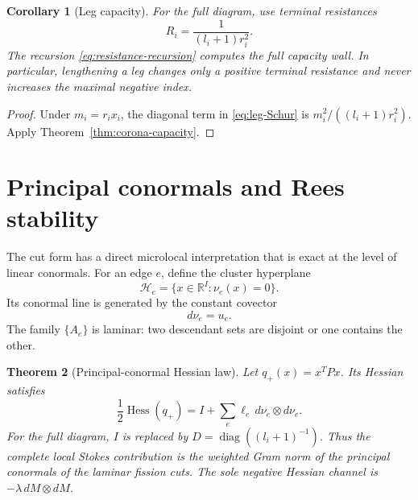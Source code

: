 \documentclass[11pt,a4paper]{amsart}
\theoremstyle{plain}
\newtheorem{theorem}{Theorem}[section]
\newtheorem{corollary}[theorem]{Corollary}
\theoremstyle{definition}
\newcommand{\RR}{\mathbb R}
\newcommand{\diag}{\operatorname{diag}}
\newcommand{\Hcal}{\mathcal H}
\begin{document}
\begin{corollary}[Leg capacity]\label{cor:leg-capacity}
For the full diagram, use terminal resistances
\begin{equation}\label{eq:leg-resistance}
                         R_i=\frac{1}{(l_i+1)r_i^2}.
\end{equation}
The recursion \eqref{eq:resistance-recursion} computes the full capacity wall.  In particular,
lengthening a leg changes only a positive terminal resistance and never increases the maximal
negative index.
\end{corollary}

\begin{proof}
Under $m_i=r_ix_i$, the diagonal term in \eqref{eq:leg-Schur} is
$m_i^2/((l_i+1)r_i^2)$.  Apply Theorem~\ref{thm:corona-capacity}.
\end{proof}

\section{Principal conormals and Rees stability}\label{sec:conormal}

The cut form has a direct microlocal interpretation that is exact at the level of linear
conormals.  For an edge $e$, define the cluster hyperplane
\begin{equation}\label{eq:cluster-hyperplane}
             \Hcal_e=\{x\in\RR^I:\nu_e(x)=0\}.
\end{equation}
Its conormal line is generated by the constant covector
\begin{equation}\label{eq:principal-conormal}
                         d\nu_e=u_e.
\end{equation}
The family $\{A_e\}$ is laminar: two descendant sets are disjoint or one contains the other.

\begin{theorem}[Principal-conormal Hessian law]\label{thm:conormal-Hessian}
Let $q_+(x)=x^TPx$.  Its Hessian satisfies
\begin{equation}\label{eq:Hessian-law}
 \frac12\operatorname{Hess}(q_+)
 =I+\sum_e\ell_e\,d\nu_e\otimes d\nu_e.
\end{equation}
For the full diagram, $I$ is replaced by
$D=\diag((l_i+1)^{-1})$.  Thus the complete local Stokes contribution is the weighted Gram norm of
the principal conormals of the laminar fission cuts.  The sole negative Hessian channel is
$-\lambda\,dM\otimes dM$.
\end{theorem}
\end{document}

